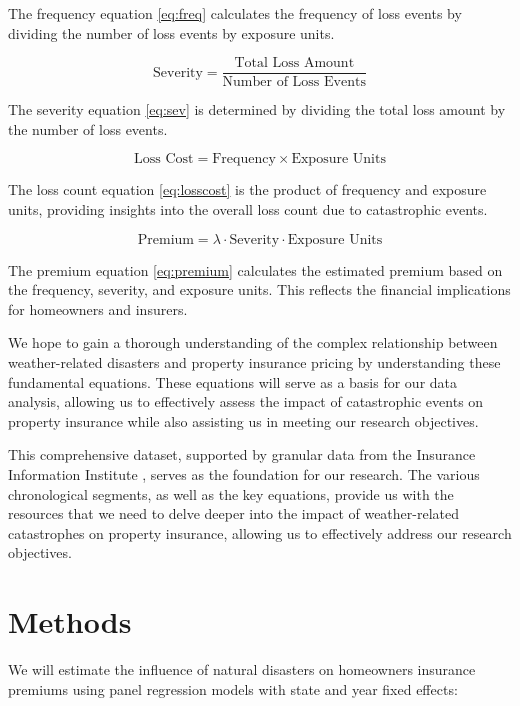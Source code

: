 \documentclass[12pt]{article}
\begin{document}
The frequency equation \ref{eq:freq} calculates the frequency of loss events by dividing the number of loss events by exposure units.

\begin{equation}
    \label{eq:sev}
    \text{Severity} = \frac{\text{Total Loss Amount}}{\text{Number of Loss Events}}
\end{equation}

The severity equation \ref{eq:sev} is determined by dividing the total loss amount by the number of loss events.

\begin{equation}
    \label{eq:losscost}
    \text{Loss Cost} = \text{Frequency} \times \text{Exposure Units}
\end{equation}

The loss count equation \ref{eq:losscost} is the product of frequency and exposure units, providing insights into the overall loss count due to catastrophic events.

\begin{equation}
    \label{eq:premium}
    \text{Premium} = \lambda \cdot \text{Severity} \cdot \text{Exposure Units}
\end{equation}

The premium equation \ref{eq:premium} calculates the estimated premium based on the frequency, severity, and exposure units. This 
reflects the financial implications for homeowners and insurers.

We hope to gain a thorough understanding of the complex relationship between weather-related disasters and property insurance pricing 
by understanding these fundamental equations. These equations will serve as a basis for our data analysis, allowing us to effectively 
assess the impact of catastrophic events on property insurance while also assisting us in meeting our research objectives.

This comprehensive dataset, supported by granular data from the Insurance Information Institute \cite{iii}, serves as the foundation 
for our research. The various chronological segments, as well as the key equations, provide us with the resources that we need to 
delve deeper into the impact of weather-related catastrophes on property insurance, allowing us to effectively address our research 
objectives. 



\section{Methods}
\label{sec:meth}
We will estimate the influence of natural disasters on homeowners insurance premiums using panel regression models with state and year 
fixed effects:
\end{document}
